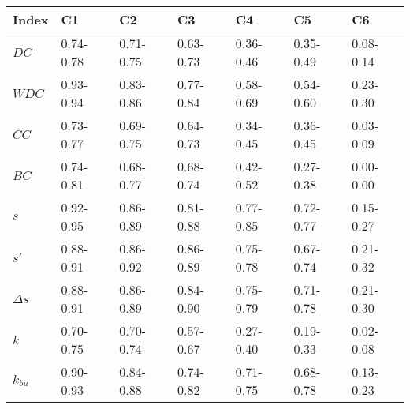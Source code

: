 \begin{table}[ht]
\centering
\begin{tabular}{lllllll}
  \hline
Index & C1 & C2 & C3 & C4 & C5 & C6 \\ 
  \hline
\(\displaystyle DC \) & {\color[HTML]{00D768} 0.74-0.78} & {\color[HTML]{EF2A00} 0.71-0.75} & {\color[HTML]{0051D7} 0.63-0.73} & {\color[HTML]{6200D7} 0.36-0.46} & {\color{orange} 0.35-0.49} & {\color[HTML]{9B9B9B} 0.08-0.14} \\ 
\(\displaystyle WDC \) &   {\color[HTML]{EF2A00} 0.93-0.94} & {\color[HTML]{00D768} 0.83-0.86} & {\color[HTML]{0051D7} 0.77-0.84} & {\color{orange} 0.58-0.69} & {\color[HTML]{6200D7} 0.54-0.60} & {\color[HTML]{9B9B9B} 0.23-0.30} \\ 
\(\displaystyle CC \) &   {\color[HTML]{00D768} 0.73-0.77} & {\color[HTML]{EF2A00} 0.69-0.75} & {\color[HTML]{0051D7} 0.64-0.73} & {\color[HTML]{6200D7} 0.34-0.45} & {\color{orange} 0.36-0.45} & {\color[HTML]{9B9B9B} 0.03-0.09} \\ 
\(\displaystyle BC \) &   {\color[HTML]{00D768} 0.74-0.81} & {\color[HTML]{0051D7} 0.68-0.77} & {\color[HTML]{EF2A00} 0.68-0.74} & {\color{orange} 0.42-0.52} & {\color[HTML]{6200D7} 0.27-0.38} & {\color[HTML]{9B9B9B} 0.00-0.00} \\ 
\(\displaystyle s \) &   {\color[HTML]{00D768} 0.92-0.95} & {\color[HTML]{EF2A00} 0.86-0.89} & {\color[HTML]{0051D7} 0.81-0.88} & {\color{orange} 0.77-0.85} & {\color[HTML]{6200D7} 0.72-0.77} & {\color[HTML]{9B9B9B} 0.15-0.27} \\ 
\(\displaystyle s' \) &   {\color[HTML]{EF2A00} 0.88-0.91} & {\color[HTML]{0051D7} 0.86-0.92} & {\color[HTML]{00D768} 0.86-0.89} & {\color[HTML]{6200D7} 0.75-0.78} & {\color{orange} 0.67-0.74} & {\color[HTML]{9B9B9B} 0.21-0.32} \\ 
\(\displaystyle \Delta s \) &   {\color[HTML]{00D768} 0.88-0.91} & {\color[HTML]{EF2A00} 0.86-0.89} & {\color[HTML]{0051D7} 0.84-0.90} & {\color[HTML]{6200D7} 0.75-0.79} & {\color{orange} 0.71-0.78} & {\color[HTML]{9B9B9B} 0.21-0.30} \\ 
\(\displaystyle k \) &   {\color[HTML]{00D768} 0.70-0.75} & {\color[HTML]{EF2A00} 0.70-0.74} & {\color[HTML]{0051D7} 0.57-0.67} & {\color[HTML]{6200D7} 0.27-0.40} & {\color{orange} 0.19-0.33} & {\color[HTML]{9B9B9B} 0.02-0.08} \\ 
\(\displaystyle k_{bu} \) &   {\color[HTML]{00D768} 0.90-0.93} & {\color[HTML]{EF2A00} 0.84-0.88} & {\color[HTML]{0051D7} 0.74-0.82} & {\color[HTML]{6200D7} 0.71-0.75} & {\color{orange} 0.68-0.78} & {\color[HTML]{9B9B9B} 0.13-0.23} \\ 

\end{tabular}
\end{table}
